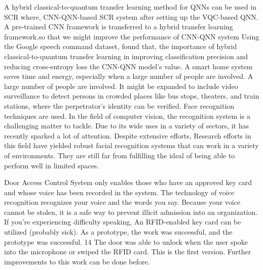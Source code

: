 A hybrid classical-to-quantum transfer learning method \parencite{13} for QNNs can be used in SCR where, CNN-QNN-based SCR system after setting up the VQC-based QNN. A pre-trained CNN framework is transferred to a hybrid transfer learning framework.so that we might improve the performance of CNN-QNN system Using the Google speech command dataset, found that, the importance of hybrid classical-to-quantum transfer learning in improving classification precision and reducing cross-entropy loss the CNN-QNN model's value. 
A smart home system \parencite{10} saves time and energy, especially when a large number of people are involved. A large number of people are involved. It might be expanded to include video surveillance to detect persons in crowded places like bus stops, theaters, and train stations, where the perpetrator's identity can be verified. Face recognition techniques are used. In the field of computer vision, the recognition system is a challenging matter to tackle. Due to its wide uses in a variety of sectors, it has recently sparked a lot of attention. Despite extensive efforts, Research efforts in this field have yielded robust facial recognition systems that can work in a variety of environments. They are still far from fulfilling the ideal of being able to perform well in limited spaces. 

Door Access Control System \parencite{11} only enables those who have an approved key card and whose voice has been recorded in the system. The technology of voice recognition recognizes your voice and the words you say. Because your voice cannot be stolen, it is a safe way to prevent illicit admission into an organization. If you're experiencing difficulty speaking, An RFID-enabled key card can be utilized (probably sick). As a prototype, the work was successful, and the prototype was successful. 14 The door was able to unlock when the user spoke into the microphone or swiped the RFID card. This is the first version. Further improvements to this work can be done before. 

